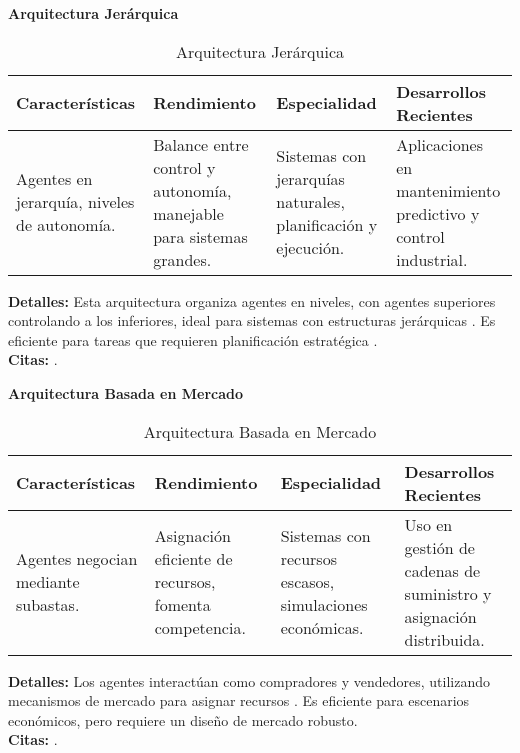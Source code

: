 	\textbf{Arquitectura Jerárquica}
	\begin{table}[h!]
		\centering
		\begin{tabular}{|p{4cm}|p{4cm}|p{4cm}|p{4cm}|}
			\hline
			\textbf{Características} & \textbf{Rendimiento} & \textbf{Especialidad} & \textbf{Desarrollos Recientes} \\
			\hline
			Agentes en jerarquía, niveles de autonomía. & Balance entre control y autonomía, manejable para sistemas grandes. & Sistemas con jerarquías naturales, planificación y ejecución. & Aplicaciones en mantenimiento predictivo y control industrial. \\
			\hline
		\end{tabular}
		\caption{Arquitectura Jerárquica}
	\end{table}
	\textbf{Detalles:} Esta arquitectura organiza agentes en niveles, con agentes superiores controlando a los inferiores, ideal para sistemas con estructuras jerárquicas \citep{ibm_multiagent}. Es eficiente para tareas que requieren planificación estratégica \citep{palau2019multi}.\\
	\textbf{Citas:} \citep{ibm_multiagent, wikipedia_multiagent, palau2019multi}.
	
	\textbf{Arquitectura Basada en Mercado}
	\begin{table}[h!]
		\centering
		\begin{tabular}{|p{4cm}|p{4cm}|p{4cm}|p{4cm}|}
			\hline
			\textbf{Características} & \textbf{Rendimiento} & \textbf{Especialidad} & \textbf{Desarrollos Recientes} \\
			\hline
			Agentes negocian mediante subastas. & Asignación eficiente de recursos, fomenta competencia. & Sistemas con recursos escasos, simulaciones económicas. & Uso en gestión de cadenas de suministro y asignación distribuida. \\
			\hline
		\end{tabular}
		\caption{Arquitectura Basada en Mercado}
	\end{table}
	\textbf{Detalles:} Los agentes interactúan como compradores y vendedores, utilizando mecanismos de mercado para asignar recursos \citep{jaimez2021towards}. Es eficiente para escenarios económicos, pero requiere un diseño de mercado robusto.\\
	\textbf{Citas:} \citep{wikipedia_multiagent, ibm_multiagent, jaimez2021towards}.
	
